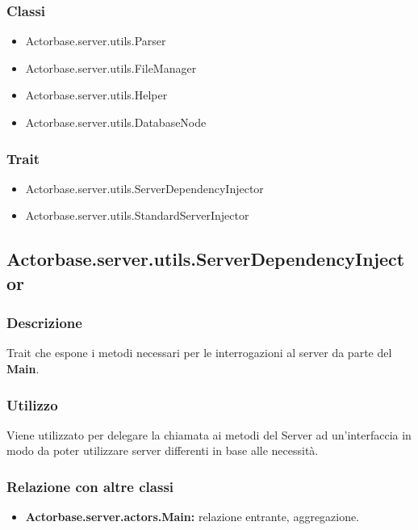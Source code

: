 \documentclass[a4paper]{article}
\begin{document}
			\subsubsection{Classi}
				\begin{itemize}
					\item Actorbase.server.utils.Parser
					\item Actorbase.server.utils.FileManager
					\item Actorbase.server.utils.Helper
					\item Actorbase.server.utils.DatabaseNode
				\end{itemize}
				
			\subsubsection{Trait}
				\begin{itemize}
					\item Actorbase.server.utils.ServerDependencyInjector
					\item Actorbase.server.utils.StandardServerInjector
				\end{itemize}
				
		\subsection{Actorbase.server.utils.ServerDependencyInjector}
			\subsubsection{Descrizione}
				Trait che espone i metodi necessari per le interrogazioni al server da parte del \textbf{Main}.
				
			\subsubsection{Utilizzo}
				Viene utilizzato per delegare la chiamata ai metodi del Server ad un'interfaccia in modo da poter utilizzare server differenti in base 
				alle necessità.
				
			\subsubsection{Relazione con altre classi}
				\begin{itemize}
					\item \textbf{Actorbase.server.actors.Main:} relazione entrante, aggregazione.
				\end{itemize}
				
\end{document}
